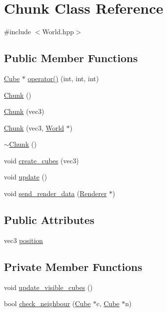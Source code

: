 \hypertarget{classChunk}{}\section{Chunk Class Reference}
\label{classChunk}


{\ttfamily \#include $<$World.\+hpp$>$}

\subsection*{Public Member Functions}
\begin{DoxyCompactItemize}
\item 
\mbox{\hyperlink{classCube}{Cube}} $\ast$ \mbox{\hyperlink{classChunk_aa95ae810408dd656b8b750c6baf42e1d}{operator()}} (int, int, int)
\item 
\mbox{\hyperlink{classChunk_acc32e1562cad6664c98ee07edecdbdf9}{Chunk}} ()
\item 
\mbox{\hyperlink{classChunk_ad48366bd231dc1fe236ddf38e15b40bf}{Chunk}} (vec3)
\item 
\mbox{\hyperlink{classChunk_a2f6fc0e3c9306d4dd7209b236305c7ad}{Chunk}} (vec3, \mbox{\hyperlink{classWorld}{World}} $\ast$)
\item 
\mbox{\hyperlink{classChunk_ad21b515f41c9a1d21740b9e7e3f8eede}{$\sim$\+Chunk}} ()
\item 
void \mbox{\hyperlink{classChunk_af2b7c93af8b369467a86687e2afde029}{create\+\_\+cubes}} (vec3)
\item 
void \mbox{\hyperlink{classChunk_a1cbe00cb7683d46b86908f29fe066f5b}{update}} ()
\item 
void \mbox{\hyperlink{classChunk_aca780fcf47255bd05242ba1d144d0672}{send\+\_\+render\+\_\+data}} (\mbox{\hyperlink{classRenderer}{Renderer}} $\ast$)
\end{DoxyCompactItemize}
\subsection*{Public Attributes}
\begin{DoxyCompactItemize}
\item 
vec3 \mbox{\hyperlink{classChunk_a7dd254022526601cff0078424b3c1a9e}{position}}
\end{DoxyCompactItemize}
\subsection*{Private Member Functions}
\begin{DoxyCompactItemize}
\item 
void \mbox{\hyperlink{classChunk_a47b3962ad57c0cceed3033f3b1eee474}{update\+\_\+visible\+\_\+cubes}} ()
\item 
bool \mbox{\hyperlink{classChunk_a6156a96628c9077e34edb0da50f4e4d2}{check\+\_\+neighbour}} (\mbox{\hyperlink{classCube}{Cube}} $\ast$c, \mbox{\hyperlink{classCube}{Cube}} $\ast$n)
\end{DoxyCompactItemize}
